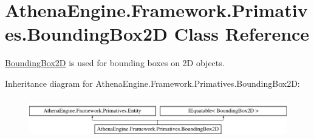\hypertarget{class_athena_engine_1_1_framework_1_1_primatives_1_1_bounding_box2_d}{\section{Athena\-Engine.\-Framework.\-Primatives.\-Bounding\-Box2\-D Class Reference}
\label{class_athena_engine_1_1_framework_1_1_primatives_1_1_bounding_box2_d}
}


\hyperlink{class_athena_engine_1_1_framework_1_1_primatives_1_1_bounding_box2_d}{Bounding\-Box2\-D} is used for bounding boxes on 2\-D objects.  


Inheritance diagram for Athena\-Engine.\-Framework.\-Primatives.\-Bounding\-Box2\-D\-:\begin{figure}[H]
\begin{center}
\leavevmode
\includegraphics[height=1.739130cm]{class_athena_engine_1_1_framework_1_1_primatives_1_1_bounding_box2_d}
\end{center}
\end{figure}
